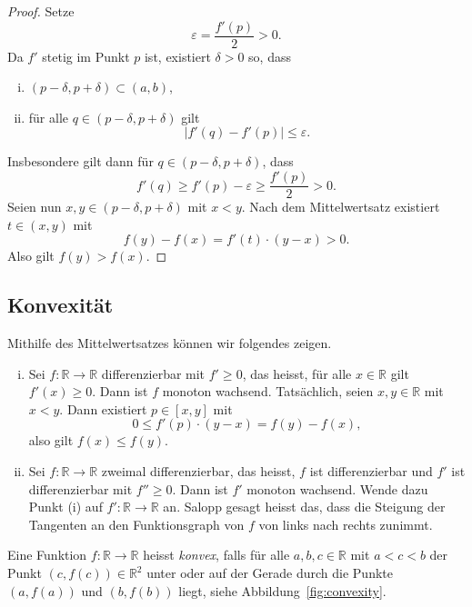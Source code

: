 \documentclass[../main.tex]{subfiles}
\begin{document}
\begin{proof}
  Setze
  \[
    \varepsilon = \frac{f'(p)}{2} > 0.
  \]
  Da $f'$ stetig im Punkt $p$ ist, existiert
  $\delta > 0$ so, dass
  \begin{enumerate}[(i)]
    \item $(p - \delta, p + \delta) \subset (a, b)$,
    \item für alle $q \in (p - \delta, p + \delta)$ 
      gilt
      \[
        |f'(q) - f'(p)| \leq \varepsilon.
      \]
  \end{enumerate}
  Insbesondere gilt dann für
  $q \in (p - \delta, p + \delta)$, dass
  \[
    f'(q) \geq f'(p) - \varepsilon \geq \frac{f'(p)}{2} > 0.
  \]
  Seien nun $x, y \in (p - \delta, p + \delta)$ mit
  $x < y$.
  Nach dem Mittelwertsatz existiert $t \in (x, y)$
  mit 
  \[f(y)  - f(x) = f'(t) \cdot (y - x) > 0. \]
  Also gilt $f(y) > f(x)$.
\end{proof}

\subsection*{Konvexität}
Mithilfe des Mittelwertsatzes können wir folgendes zeigen.
\begin{enumerate}[(i)]
  \item 
    Sei $f \colon \mathbb{R} \to \mathbb{R}$ differenzierbar
    mit $f' \geq 0$, das heisst, für alle $x \in \mathbb{R}$ 
    gilt $f'(x) \geq 0$.
    Dann ist $f$ monoton wachsend.
    Tatsächlich, seien $x, y \in \mathbb{R}$ mit $x < y$.
    Dann existiert $p \in [x, y]$ mit
    \[
      0 \leq f'(p) \cdot (y - x) = f(y) - f(x),
    \]
    also gilt $f(x) \leq f(y)$.
  \item
    Sei $f \colon \mathbb{R} \to \mathbb{R}$ zweimal
    differenzierbar, das heisst, $f$ ist differenzierbar
    und $f'$ ist differenzierbar mit $f'' \geq 0$.
    Dann ist $f'$ monoton wachsend.
    Wende dazu Punkt (i) auf
    $f' \colon\mathbb{R} \to \mathbb{R}$ 
    an.
    Salopp gesagt heisst das,
    dass die Steigung der Tangenten an den
    Funktionsgraph von $f$ von links nach rechts
    zunimmt.
\end{enumerate}

\begin{definition}
  Eine Funktion $f \colon \mathbb{R} \to \mathbb{R}$ 
  heisst \emph{konvex}, falls für alle $a, b, c \in \mathbb{R}$ 
  mit $a < c < b$ der Punkt
  $(c, f(c))
  \in \mathbb{R}^2$ unter
  oder auf der Gerade durch die Punkte
  $(a, f(a))$ und $(b, f(b))$ liegt,
  siehe Abbildung~\ref{fig:convexity}.
\end{definition}
\end{document}
